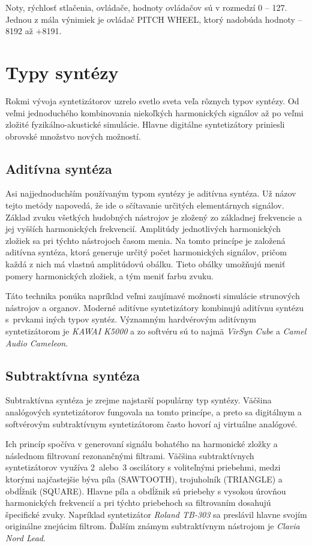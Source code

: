 Noty, rýchlosť stlačenia, ovládače, hodnoty ovládačov sú v rozmedzí 0 -- 127. Jednou z mála výnimiek je ovládač PITCH WHEEL, ktorý nadobúda hodnoty --8192 až +8191.

\section{Typy syntézy}

Rokmi vývoja syntetizátorov uzrelo svetlo sveta veľa rôznych typov syntézy. Od veľmi jednoduchého kombinovania niekoľkých harmonických signálov až po veľmi zložité fyzikálno-akustické simulácie. Hlavne digitálne syntetizátory priniesli obrovské množstvo nových možností.

\subsection{Aditívna syntéza}
Asi najjednoduchším používaným typom syntézy je aditívna syntéza. Už názov tejto metódy napovedá, že ide o sčítavanie určitých elementárnych signálov. Základ zvuku všetkých hudobných nástrojov je zložený zo základnej frekvencie a jej vyšších harmonických frekvencií. Amplitúdy jednotlivých harmonických zložiek sa pri týchto nástrojoch časom menia. Na tomto princípe je založená aditívna syntéza, ktorá generuje určitý počet harmonických signálov, pričom každá z nich má vlastnú amplitúdovú obálku. Tieto obálky umožňujú meniť pomery harmonických zložiek, a tým meniť farbu zvuku.

Táto technika ponúka napríklad veľmi zaujímavé možnosti simulácie strunových nástrojov a organov. Moderné aditívne syntetizátory kombinujú aditívnu syntézu s~prvkami iných typov syntéz. Významným hardvérovým aditívnym syntetizátorom je \emph{KAWAI K5000} a zo softvéru sú to najmä \emph{VirSyn Cube} a \emph{Camel Audio Cameleon}.

\subsection{Subtraktívna syntéza}
Subtraktívna syntéza je zrejme najstarší populárny typ syntézy. Väčšina analógových syntetizátorov fungovala na tomto princípe, a preto sa digitálnym a softvérovým subtraktívnym syntetizátorom často hovorí aj \bq virtuálne analógové\eq .

Ich princíp spočíva v generovaní signálu bohatého na harmonické zložky a následnom filtrovaní rezonančnými filtrami. Väčšina subtraktívnych syntetizátorov využíva 2~alebo~3 oscilátory s voliteľnými priebehmi, medzi ktorými najčastejšie býva píla (SAWTOOTH), trojuholník (TRIANGLE) a obdĺžnik (SQUARE). Hlavne píla a obdĺžnik sú priebehy s vysokou úrovňou harmonických frekvencií a pri týchto priebehoch sa filtrovaním dosahujú špecifické zvuky. Napríklad syntetizátor \emph{Roland TB-303} sa preslávil hlavne svojím originálne znejúcim filtrom. Ďalším známym subtraktívnym nástrojom je \emph{Clavia Nord Lead}.

